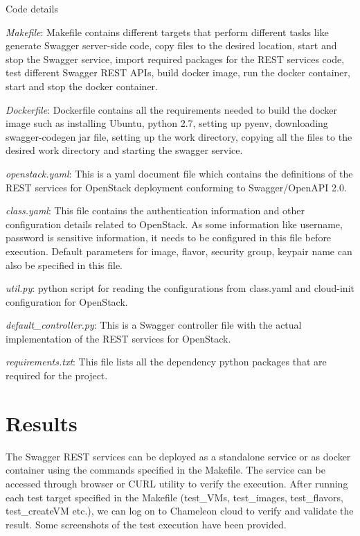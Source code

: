 Code details
\begin{description}

\item \textit{Makefile}: Makefile contains different targets that perform
different tasks like generate Swagger server-side code, copy files to the
desired location, start and stop the Swagger service, import required packages
for the REST services code, test different Swagger REST APIs, build docker
image, run the docker container, start and stop the docker container.

\item \textit{Dockerfile}: Dockerfile contains all the requirements needed to
build the docker image such as installing Ubuntu, python 2.7, setting up pyenv,
downloading swagger-codegen jar file, setting up the work directory, copying 
all the files to the desired work directory and starting the swagger service. 

\item \textit{openstack.yaml}: This is a yaml document file which contains the
definitions of the REST services for OpenStack deployment conforming to
Swagger/OpenAPI 2.0.

\item \textit{class.yaml}: This file contains the authentication information 
and other configuration details related to OpenStack. As some information like
username, password is sensitive information, it needs to be
configured in this file before execution. Default parameters for image, flavor,
security group, keypair name can also be specified in this file.

\item \textit{util.py}: python script for reading the configurations from
class.yaml and cloud-init configuration for OpenStack.

\item \textit{default\_controller.py}: This is a Swagger controller file with
the actual implementation of the REST services for OpenStack.

\item \textit{requirements.txt}: This file lists all the dependency python
packages that are required for the project.
\end{description}

\section{Results}
The Swagger REST services can be deployed as a standalone service or as docker
container using the commands specified in the Makefile. The service can be
accessed through browser or CURL utility to verify the execution. After running
each test target specified in the Makefile (test\_VMs, test\_images,
test\_flavors, test\_createVM etc.), we can log on to Chameleon cloud to verify
and validate the result. Some screenshots of the test execution have been
provided. 

